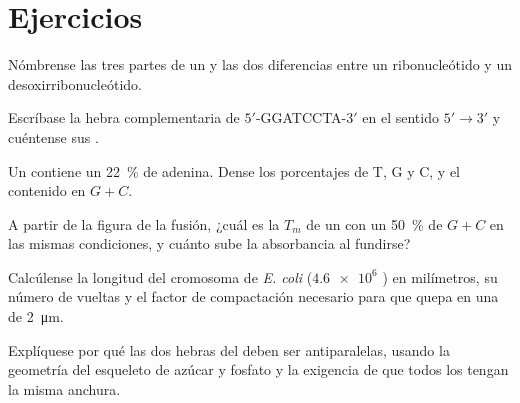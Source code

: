 \section{Ejercicios}

\begin{exercise}[$\star$]\label{exo:b1:nucleic-acids:1}
Nómbrense las tres partes de un  y las dos diferencias entre un
ribonucleótido y un desoxirribonucleótido.
\end{exercise}

\begin{exercise}[$\star$]\label{exo:b1:nucleic-acids:2}
Escríbase la hebra complementaria de $5'$-GGATCCTA-$3'$ en el sentido
$5' \to 3'$ y cuéntense sus .
\end{exercise}

\begin{exercise}[$\star$]\label{exo:b1:nucleic-acids:3}
Un  contiene un \qty{22}{\%} de adenina. Dense los porcentajes de T, G y
C, y el contenido en $G + C$.
\end{exercise}

\begin{exercise}[$\star$]\label{exo:b1:nucleic-acids:4}
A partir de la figura de la fusión, ¿cuál es la $T_m$ de un  con un
\qty{50}{\%} de $G + C$ en las mismas condiciones, y cuánto sube la
absorbancia al fundirse?
\end{exercise}

\begin{exercise}[$\star\star$]\label{exo:b1:nucleic-acids:5}
Calcúlense la longitud del cromosoma de \emph{E. coli} ($\num{4.6e6}$ ) en milímetros, su número de vueltas y el factor de compactación
necesario para que quepa en una  de \qty{2}{\micro m}.
\end{exercise}

\begin{exercise}[$\star\star$]\label{exo:b1:nucleic-acids:6}
Explíquese por qué las dos hebras del  deben ser antiparalelas, usando la
geometría del esqueleto de azúcar y fosfato y la exigencia de que todos los
 tengan la misma anchura.
\end{exercise}

